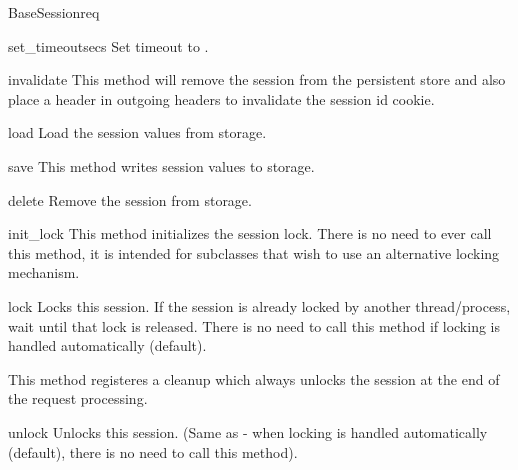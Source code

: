 \begin{classdesc}{BaseSession}{req}
  \begin{methoddesc}[BaseSession]{set_timeout}{secs}
    Set timeout to .
  \end{methoddesc}

  \begin{methoddesc}[BaseSession]{invalidate}{}
    This method will remove the session from the persistent store and
    also place a header in outgoing headers to invalidate the session
    id cookie.
  \end{methoddesc}

  \begin{methoddesc}[BaseSession]{load}{}
    Load the session values from storage.
  \end{methoddesc}

  \begin{methoddesc}[BaseSession]{save}{}
    This method writes session values to storage.
  \end{methoddesc}

  \begin{methoddesc}[BaseSession]{delete}{}
    Remove the session from storage.
  \end{methoddesc}

  \begin{methoddesc}[BaseSession]{init_lock}{}
    This method initializes the session lock. There is no need to ever
    call this method, it is intended for subclasses that wish to use
    an alternative locking mechanism.
  \end{methoddesc}

  \begin{methoddesc}[BaseSession]{lock}{}
    Locks this session. If the session is already locked by another
    thread/process, wait until that lock is released. There is no need
    to call this method if locking is handled automatically (default).

    This method registeres a cleanup which always unlocks the session
    at the end of the request processing.
  \end{methoddesc}

  \begin{methoddesc}[BaseSession]{unlock}{}
    Unlocks this session. (Same as  - when locking is
    handled automatically (default), there is no need to call this
    method).
  \end{methoddesc}


\end{classdesc}

